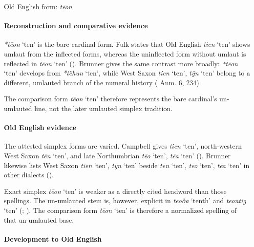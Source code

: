 \documentclass[
  british,
  a4paper,
]{article}
\providecommand{\Recon}[1]{\emph{*#1}}
\begin{document}
Old English form: \emph{tēon}

\paragraph{Reconstruction and comparative
evidence}\label{reconstruction-and-comparative-evidence-87}

\Recon{tēon} `ten' is the bare cardinal form. Fulk states that Old
English \emph{tien} `ten' shows umlaut from the inflected forms, whereas
the uninflected form without umlaut is reflected in \emph{tēon} `ten'
(). Brunner gives the same
contrast more broadly: \Recon{tēon} `ten' develops from \Recon{tëhun}
`ten', while West Saxon \emph{tien} `ten', \emph{tȳn} `ten' belong to a
different, umlauted branch of the numeral history
( Anm.
6, 234).

The comparison form \emph{tēon} `ten' therefore represents the bare
cardinal's un-umlauted line, not the later umlauted simplex tradition.

\paragraph{Old English evidence}\label{old-english-evidence-89}

The attested simplex forms are varied. Campbell gives \emph{tien} `ten',
north-western West Saxon \emph{tēn} `ten', and late Northumbrian
\emph{tēo} `ten', \emph{tēa} `ten' (). Brunner likewise lists West Saxon \emph{tien} `ten',
\emph{tȳn} `ten' beside \emph{tēn} `ten', \emph{tēo} `ten', \emph{tēa}
`ten' in other dialects ().

Exact simplex \emph{tēon} `ten' is weaker as a directly cited headword
than those spellings. The un-umlauted stem is, however, explicit in
\emph{tēoða} `tenth' and \emph{tēontig} `ten'
(;
). The comparison form
\emph{tēon} `ten' is therefore a normalized spelling of that un-umlauted
base.

\paragraph{Development to Old
English}\label{development-to-old-english-87}
\end{document}
